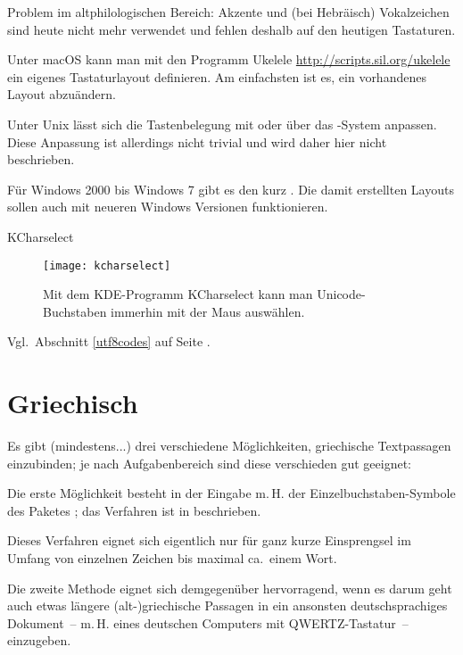 Problem im altphilologischen Bereich: Akzente und (bei Hebräisch) Vokalzeichen sind heute
nicht mehr verwendet und fehlen deshalb auf den heutigen Tastaturen.

Unter macOS kann man mit den Programm Ukelele \url{http://scripts.sil.org/ukelele} ein eigenes
Tastaturlayout definieren. Am einfachsten ist es, ein vorhandenes Layout abzuändern.

Unter Unix lässt sich die Tastenbelegung mit  oder über das -System
anpassen. Diese Anpassung ist allerdings nicht trivial und wird daher hier nicht beschrieben.

Für Windows 2000 bis Windows 7 gibt es den  kurz .
Die damit erstellten Layouts sollen auch mit neueren Windows Versionen funktionieren.

KCharselect

\begin{figure}
 \texttt{[image: kcharselect]}
 \caption{Mit dem KDE-Programm KCharselect kann man Unicode-Buchstaben immerhin mit der Maus
 auswählen.}
\end{figure}


Vgl.\ Abschnitt \ref{utf8codes} auf Seite \pageref{utf8codes}.

\section{Griechisch}

Es gibt (mindestens...) drei verschiedene Möglichkeiten, griechische Textpassagen einzubinden;
je nach Aufgabenbereich sind diese verschieden gut geeignet:



Die erste Möglichkeit besteht in der Eingabe m.\,H. der Einzelbuchstaben-Symbole des Paketes
; das Verfahren ist in   beschrieben.

Dieses Verfahren eignet sich eigentlich nur für ganz kurze Einsprengsel im Umfang von
einzelnen Zeichen bis maximal ca.\ einem Wort.



Die zweite Methode eignet sich demgegenüber hervorragend, wenn es darum geht auch etwas
längere (alt-)griechische Passagen in ein ansonsten deutschsprachiges Dokument~-- m.\,H. eines
deutschen Computers mit QWERTZ-Tastatur~-- einzugeben.


